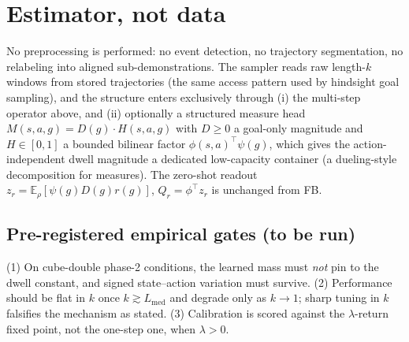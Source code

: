 \documentclass{article}
\newcommand{\M}{M}
\providecommand{\E}{\mathbb{E}}
\begin{document}
\section{Estimator, not data}

No preprocessing is performed: no event detection, no trajectory segmentation,
no relabeling into aligned sub-demonstrations. The sampler reads raw
length-\(k\) windows from stored trajectories (the same access pattern used by
hindsight goal sampling), and the structure enters exclusively through
(i) the multi-step operator above, and (ii) optionally a structured measure head
\(\M(s,a,g)=D(g)\cdot H(s,a,g)\) with \(D\ge0\) a goal-only magnitude and
\(H\in[0,1]\) a bounded bilinear factor \(\phi(s,a)^{\!\top}\psi(g)\), which
gives the action-independent dwell magnitude a dedicated low-capacity container
(a dueling-style decomposition for measures). The zero-shot readout
\(z_r=\E_{\rho}[\psi(g)D(g)r(g)]\), \(Q_r=\phi^{\top}z_r\) is unchanged from FB.

\subsection*{Pre-registered empirical gates (to be run)}
(1) On cube-double phase-2 conditions, the learned mass must \emph{not} pin to
the dwell constant, and signed state--action variation must survive.
(2) Performance should be flat in \(k\) once \(k\gtrsim L_{\mathrm{med}}\) and
degrade only as \(k\to1\); sharp tuning in \(k\) falsifies the mechanism as
stated. (3) Calibration is scored against the \(\lambda\)-return fixed point,
not the one-step one, when \(\lambda>0\).



\end{document}
